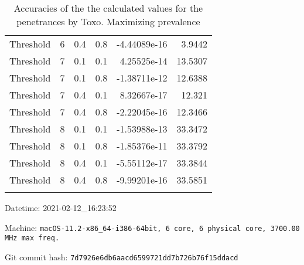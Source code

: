 \documentclass{article}
\begin{document}
\begin{longtable}[H]{lrrrrr}
 Threshold      &       6 &   0.4 &            0.8 &     -4.44089e-16 &          3.9442 \\
 Threshold      &       7 &   0.1 &            0.1 &      4.25525e-14 &         13.5307 \\
 Threshold      &       7 &   0.1 &            0.8 &     -1.38711e-12 &         12.6388 \\
 Threshold      &       7 &   0.4 &            0.1 &      8.32667e-17 &         12.321  \\
 Threshold      &       7 &   0.4 &            0.8 &     -2.22045e-16 &         12.3466 \\
 Threshold      &       8 &   0.1 &            0.1 &     -1.53988e-13 &         33.3472 \\
 Threshold      &       8 &   0.1 &            0.8 &     -1.85376e-11 &         33.3792 \\
 Threshold      &       8 &   0.4 &            0.1 &     -5.55112e-17 &         33.3844 \\
 Threshold      &       8 &   0.4 &            0.8 &     -9.99201e-16 &         33.5851 \\
\hline

\caption{Accuracies of the the calculated values for the penetrances by Toxo. Maximizing prevalence}
\end{longtable}
Datetime: 2021-02-12\_16:23:52

Machine: \texttt{macOS-11.2-x86\_64-i386-64bit, 6 core, 6 physical core, 3700.00 MHz max freq.}

Git commit hash: \texttt{7d7926e6db6aacd6599721dd7b726b76f15ddacd}
\end{document}

